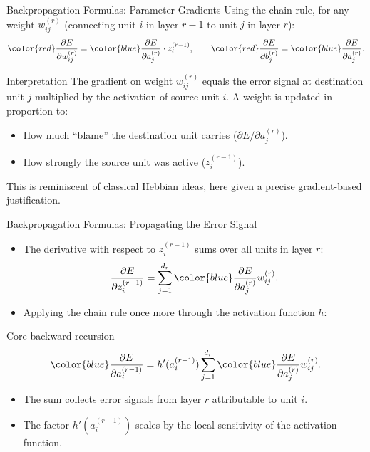 \begin{frame}{Backpropagation Formulas: Parameter Gradients}
  Using the chain rule, for any weight $w_{ij}^{(r)}$ (connecting unit $i$ in layer $r-1$ to unit $j$ in layer $r$):
  \[
    {\color{red}\frac{\partial E}{\partial w_{ij}^{(r)}}} = {\color{blue}\frac{\partial E}{\partial a_j^{(r)}}} \cdot z_i^{(r-1)},
    \qquad
    {\color{red}\frac{\partial E}{\partial b_j^{(r)}}} = {\color{blue}\frac{\partial E}{\partial a_j^{(r)}}}.
  \]
  \begin{block}{Interpretation}
    The gradient on weight $w_{ij}^{(r)}$ equals the \alert{error signal at destination unit $j$} multiplied by
    the \alert{activation of source unit $i$}. A weight is updated in proportion to:
    \begin{itemize}
      \item How much ``blame'' the destination unit carries ($\partial E / \partial a_j^{(r)}$).
      \item How strongly the source unit was active ($z_i^{(r-1)}$).
    \end{itemize}
  \end{block}
  This is reminiscent of classical Hebbian ideas, here given a precise gradient-based justification.
\end{frame}

\begin{frame}{Backpropagation Formulas: Propagating the Error Signal}
  \begin{itemize}
    \item The derivative with respect to $z_i^{(r-1)}$ sums over all units in layer $r$:
    \[
      \frac{\partial E}{\partial z_i^{(r-1)}} = \sum_{j=1}^{d_r} {\color{blue}\frac{\partial E}{\partial a_j^{(r)}}} w_{ij}^{(r)}.
    \]
    \item Applying the chain rule once more through the activation function $h$:
  \end{itemize}
  \begin{block}{Core backward recursion}
    \[
      {\color{blue}\frac{\partial E}{\partial a_i^{(r-1)}}}
      = h'(a_i^{(r-1)}) \sum_{j=1}^{d_r} {\color{blue}\frac{\partial E}{\partial a_j^{(r)}}} w_{ij}^{(r)}.
    \]
  \end{block}
  \begin{itemize}
    \item The sum collects error signals from layer $r$ attributable to unit $i$.
    \item The factor $h'(a_i^{(r-1)})$ scales by the \alert{local sensitivity} of the activation function.
  \end{itemize}
\end{frame}

